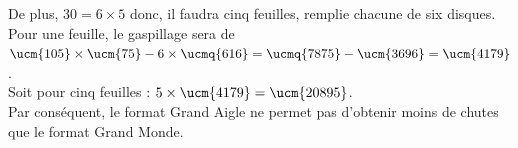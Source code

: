 {\begin{corrige}
\begin{enumerate}
         De plus, $30 =6\times5$ donc, il faudra cinq feuilles, remplie chacune de six disques. \\
         Pour une feuille, le gaspillage sera de $\ucm{105}\times\ucm{75}-6\times\ucmq{616} =\ucmq{7875}-\ucm{3696} =\ucm{4179}$. \\
         Soit pour cinq feuilles : $5\times\ucm{4179} =\ucm{20895}$. \\
         Par conséquent, {\blue le format Grand Aigle ne permet pas d'obtenir moins de chutes que le format Grand Monde}.
   \end{enumerate}
\end{corrige}


}
